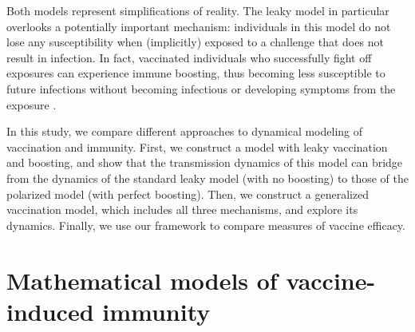 \documentclass[12pt]{article}
\begin{document}
Both models represent simplifications of reality.
The leaky model in particular overlooks a potentially important mechanism: individuals in this model do not lose any susceptibility when (implicitly) exposed to a challenge that does not result in infection. 
In fact, vaccinated individuals who successfully fight off exposures can experience immune boosting, thus becoming less susceptible to future infections without becoming infectious or developing symptoms from the exposure \citep{lavine2011natural,yang2020waning}.

In this study, we compare different approaches to dynamical modeling of vaccination and immunity.
First, we construct a model with leaky vaccination and boosting, and show that the transmission dynamics of this model can bridge from the dynamics of the standard leaky model (with no boosting) to those of the polarized model (with perfect boosting). 
Then, we construct a generalized vaccination model, which includes all three mechanisms, and explore its dynamics.
Finally, we use our framework to compare measures of vaccine efficacy.

\section*{Mathematical models of vaccine-induced immunity}

\end{document}

